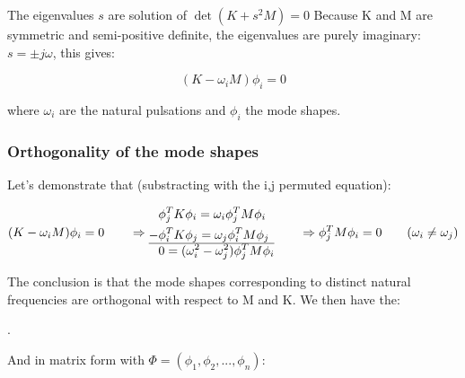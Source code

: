 			The eigenvalues $s$ are solution of $\det (K+s^2M) = 0$ Because K and M are symmetric and semi-positive definite, the eigenvalues are purely imaginary: $s= \pm j\omega$, this gives:
			
			\begin{equation}
				(K-\omega _i M)\phi _i = 0
			\end{equation}
			
			where $\omega _i$ are the natural pulsations and $\phi _i$ the mode shapes. 
			
			\subsubsection{Orthogonality of the mode shapes}
				Let's demonstrate that (substracting with the i,j permuted equation): 
				
				\begin{equation}
				(K-\omega _i M) \phi _i = 0 \qquad \Rightarrow
				\begin{aligned}
				&\phi _j ^T K \phi _i = \omega _i \phi _j ^TM\phi _i\\
				-&\phi _i ^T K \phi _j = \omega _j \phi _i ^TM\phi _j\\
				\hline 
				&0 = (\omega _i ^2- \omega _j^2)\phi _j ^T M \phi _i
				\end{aligned}
				\qquad \Rightarrow \phi _j ^T M \phi _i = 0 \qquad (\omega _i \neq \omega _j)
				\end{equation}
				
				The conclusion is that the mode shapes corresponding to distinct natural frequencies are orthogonal with respect to M and K. We then have the:
				
				 
				\begin{center}
				\end{center}. 
				
				And in matrix form with $\Phi = (\phi _1, \phi _2, ..., \phi _n)$:
				
				\begin{center}
				\end{center}
				
